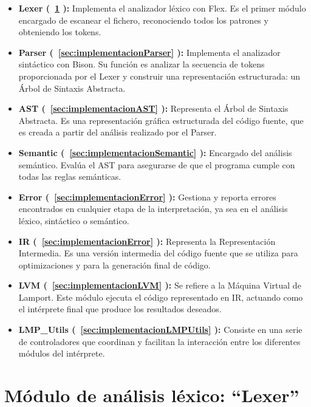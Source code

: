 \begin{itemize}
    \item \textbf{Lexer (~\ref{sec:implementacionLexer} ):} Implementa el analizador léxico con Flex. Es el primer módulo encargado de escanear el fichero, reconociendo todos los patrones y obteniendo los tokens.
    
    \item \textbf{Parser (~\ref{sec:implementacionParser} ):} Implementa el analizador sintáctico con Bison. Su función es analizar la secuencia de tokens proporcionada por el Lexer y construir una representación estructurada: un Árbol de Sintaxis Abstracta.
    
    \item \textbf{AST (~\ref{sec:implementacionAST} ):} Representa el Árbol de Sintaxis Abstracta. Es una representación gráfica estructurada del código fuente, que es creada a partir del análisis realizado por el Parser.
    
    \item \textbf{Semantic (~\ref{sec:implementacionSemantic} ):} Encargado del análisis semántico. Evalúa el AST para asegurarse de que el programa cumple con todas las reglas semánticas.
    
    \item \textbf{Error (~\ref{sec:implementacionError} ):} Gestiona y reporta errores encontrados en cualquier etapa de la interpretación, ya sea en el análisis léxico, sintáctico o semántico.
    
    \item \textbf{IR (~\ref{sec:implementacionError} ):} Representa la Representación Intermedia. Es una versión intermedia del código fuente que se utiliza para optimizaciones y para la generación final de código.
    
    \item \textbf{LVM (~\ref{sec:implementacionLVM} ):} Se refiere a la Máquina Virtual de Lamport. Este módulo ejecuta el código representado en IR, actuando como el intérprete final que produce los resultados deseados.
    
    \item \textbf{LMP\_Utils (~\ref{sec:implementacionLMPUtils} ):} Consiste en una serie de controladores que coordinan y facilitan la interacción entre los diferentes módulos del intérprete.
    
\end{itemize}

\section{Módulo de análisis léxico: ``Lexer''}\label{sec:implementacionLexer}

